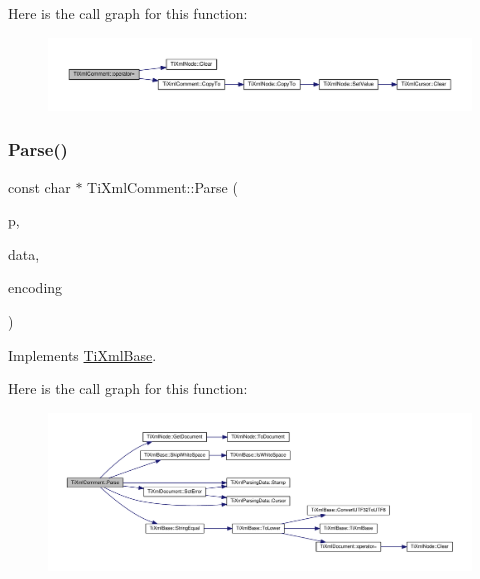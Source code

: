 Here is the call graph for this function\+:
\nopagebreak
\begin{figure}[H]
\begin{center}
\leavevmode
\includegraphics[width=350pt]{class_ti_xml_comment_aeceedc15f8b8f9ca0b6136696339b3ac_cgraph}
\end{center}
\end{figure}
\mbox{\label{class_ti_xml_comment_a43bddc18ac057734b41d84653b71d3e0}} 
\subsubsection{\texorpdfstring{Parse()}{Parse()}}
{\footnotesize\ttfamily const char $\ast$ Ti\+Xml\+Comment\+::\+Parse (\begin{DoxyParamCaption}\item[{const char $\ast$}]{p,  }\item[{\hyperlink{class_ti_xml_parsing_data}{Ti\+Xml\+Parsing\+Data} $\ast$}]{data,  }\item[{\hyperlink{tinyxml_8h_a88d51847a13ee0f4b4d320d03d2c4d96}{Ti\+Xml\+Encoding}}]{encoding }\end{DoxyParamCaption})\hspace{0.3cm}{\ttfamily [virtual]}}



Implements \hyperlink{class_ti_xml_base_a00e4edb0219d00a1379c856e5a1d2025}{Ti\+Xml\+Base}.

Here is the call graph for this function\+:
\nopagebreak
\begin{figure}[H]
\begin{center}
\leavevmode
\includegraphics[width=350pt]{class_ti_xml_comment_a43bddc18ac057734b41d84653b71d3e0_cgraph}
\end{center}
\end{figure}
\mbox{\label{class_ti_xml_comment_a873171beac19d40f0eaae945711c98ed}} 
